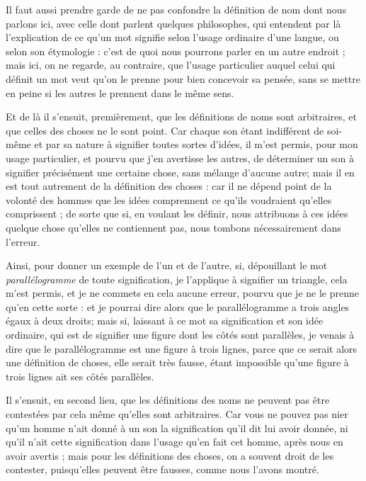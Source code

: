 Il faut aussi prendre garde de ne pas confondre la définition de nom dont nous parlons ici, avec celle dont parlent quelques philosophes, qui entendent par là l'explication de ce qu'un mot signifie selon l'usage ordinaire d'une langue, ou selon son étymologie : c'est de quoi nous pourrons parler en un autre endroit ; mais ici, on ne regarde, au contraire, que l'usage particulier auquel celui qui définit un mot veut qu'on le prenne pour bien concevoir sa pensée, sans se mettre en peine si les autres le prennent dans le même sens.

Et de là il s'ensuit, premièrement, que les définitions de noms sont arbitraires, et que celles des choses ne le sont point. Car chaque son étant indifférent de soi-même et par sa nature à signifier toutes sortes d'idées, il m'est permis, pour mon usage particulier, et pourvu que j'en avertisse les autres, de déterminer un son à signifier précisément une certaine chose, sans mélange d'aucune autre; mais il en est tout autrement de la définition des choses : car il ne dépend point de la volonté des hommes que les idées comprennent ce qu'ils voudraient qu'elles comprissent ; de sorte que si, en voulant les définir, nous attribuons à ces idées quelque chose qu'elles ne contiennent pas, nous tombons nécessairement dans l'erreur.

Ainsi, pour donner un exemple de l'un et de l'autre, si, dépouillant le mot \emph{parallélogramme} de toute signification, je l'applique à signifier un triangle, cela m'est permis, et je ne commets en cela aucune erreur, pourvu que je ne le prenne qu'en cette sorte : et je pourrai dire alors que le parallélogramme a trois angles égaux à deux droits; mais si, laissant à ce mot sa signification et son idée ordinaire, qui est de signifier une figure dont les côtés sont parallèles, je venais à dire que le parallélogramme est une figure à trois lignes, parce que ce serait alors une définition de choses, elle serait très fausse, étant impossible qu'une figure à trois lignes ait ses côtés parallèles.

Il s'ensuit, en second lieu, que les définitions des noms ne peuvent pas être contestées par cela même qu'elles sont arbitraires. Car vous ne pouvez pas nier qu'un homme n'ait donné à un son la signification qu'il dit lui avoir donnée, ni qu'il n'ait cette signification dans l'usage qu'en fait cet homme, après nous en avoir avertis ; mais pour les définitions des choses, on a souvent droit de les contester, puisqu'elles peuvent être fausses, comme nous l'avons montré.

